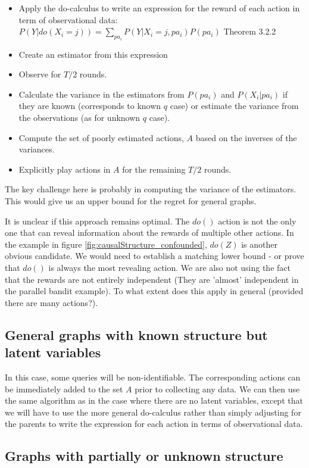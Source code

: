 \begin{itemize}
\item Apply the do-calculus to write an expression for the reward of each action in term of observational data: $P(Y|do(X_i=j)) = \sum_{pa_i} P(Y|X_i = j,pa_i)P(pa_i)$ \cite{Pearl2000} Theorem 3.2.2
\item Create an estimator from this expression
\item Observe for $T/2$ rounds.
\item Calculate the variance in the estimators from $P(pa_i)$ and $P(X_i|pa_i)$ if they are known (corresponds to known $q$ case) or estimate the variance from the observations (as for unknown $q$ case). 
\item Compute the set of poorly estimated actions, $A$ based on the inverses of the variances.
\item Explicitly play actions in $A$ for the remaining $T/2$ rounds.
\end{itemize}

The key challenge here is probably in computing the variance of the estimators. This would give us an upper bound for the regret for general graphs. 

It is unclear if this approach remains optimal. The $do()$ action is not the only one that can reveal information about the rewards of multiple other actions. In the example in figure \ref{fig:causalStructure_confounded}, $do(Z)$ is another obvious candidate. We would need to establish a matching lower bound - or prove that $do()$ is always the most revealing action. We are also not using the fact that the rewards are not entirely independent (They are 'almost' independent in the parallel bandit example). To what extent does this apply in general (provided there are many actions?).


\subsection{General graphs with known structure but latent variables}
In this case, some queries will be non-identifiable. The corresponding actions can be immediately added to the set $A$ prior to collecting any data. We can then use the same algorithm as in the case where there are no latent variables, except that we will have to use the more general do-calculus rather than simply adjusting for the parents to write the expression for each action in terms of observational data. 

\subsection{Graphs with partially or unknown structure}

